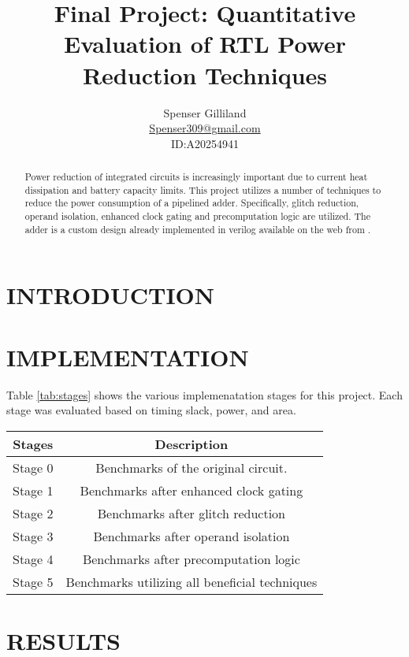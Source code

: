 \documentclass[10pt,letterpaper]{article}
\author{Spenser Gilliland\\
\url{Spenser309@gmail.com}\\
ID:A20254941}
\title{Final Project: Quantitative Evaluation of RTL Power Reduction Techniques}
\begin{document}
\maketitle
\bigskip

\begin{abstract}
Power reduction of integrated circuits is increasingly important due to current heat dissipation and battery capacity limits.  This project utilizes a number of techniques to reduce the power consumption of a pipelined adder.  Specifically, glitch reduction, operand isolation, enhanced clock gating and precomputation logic are utilized. The adder is a custom design already implemented in verilog available on the web from \cite{code}.
\end{abstract}

\pagebreak

\section{INTRODUCTION}


\section{IMPLEMENTATION}

Table \ref{tab:stages} shows the various implemenatation stages for this project. Each stage was evaluated based on timing slack, power, and area.

\begin{center}
\begin{tabular}{|c|c|}
\hline Stages & Description \\
\hline 
\hline Stage 0 & Benchmarks of the original circuit. \\ 
\hline Stage 1 & Benchmarks after enhanced clock gating \\ 
\hline Stage 2 & Benchmarks after glitch reduction \\ 
\hline Stage 3 & Benchmarks after operand isolation \\ 
\hline Stage 4 & Benchmarks after precomputation logic \\ 
\hline Stage 5 & Benchmarks utilizing all beneficial techniques \\ 
\hline 
\end{tabular} 
\end{center}

\section{RESULTS}
\end{document}
